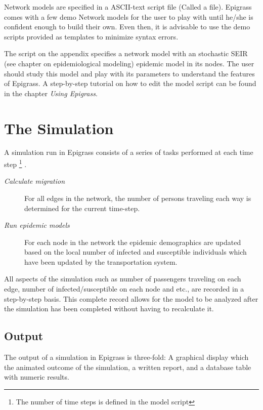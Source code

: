 \documentclass[a4paper,10pt,english]{sphinxmanual}
\begin{document}
Network models are specified in a ASCII-text script file (Called a  file). Epigrass comes with a few demo Network models for the user to play with until he/she is confident enough to build their own. Even then, it is advisable to use the demo scripts provided as templates to minimize syntax errors.

The script on the appendix  specifies a network model with an stochastic SEIR (see chapter on epidemiological modeling) epidemic model in its nodes. The user should study this model and play with its parameters to understand the features of Epigrass. A step-by-step tutorial on how to edit the model script can be found in the chapter \emph{Using Epigrass}.


\section{The Simulation}
\label{overview:the-simulation}
A simulation run in Epigrass consists of a series of tasks performed at each time step \footnote{
The number of time steps is defined in the model script
} .
\begin{description}
\item[{\emph{Calculate migration}}] \leavevmode
For all edges in the network, the number of persons traveling each way is determined for the current time-step.

\item[{\emph{Run epidemic models}}] \leavevmode
For each node in the network the epidemic demographics are updated based on the local number of infected and susceptible individuals which have been updated by the transportation system.

\end{description}

All aspects of the simulation such as number of passengers traveling on each edge, number of infected/susceptible on each node and etc., are recorded in a step-by-step basis. This complete record allows for the model to be analyzed after the simulation has been completed without having to recalculate it.


\subsection{Output}
\label{overview:output}
The output of a simulation in Epigrass is three-fold: A graphical display which the animated outcome of the simulation,  a written report, and a database table with numeric results.
\end{document}

